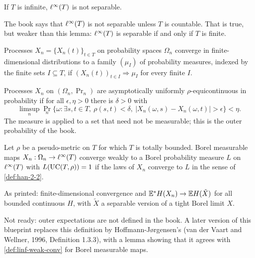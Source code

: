 \begin{lemma}
  \label{lem:linf-nonseparable}
  If $T$ is infinite, $\ell^\infty(T)$ is not separable.
\end{lemma}
\begin{remark}
  The book says that $\ell^\infty(T)$ is not separable unless $T$ is countable. That is true, but weaker than this lemma: $\ell^\infty(T)$ is separable if and only if $T$ is finite.
\end{remark}

\begin{definition}
  \label{def:fidi}
  Processes $X_n=\{X_n(t)\}_{t\in T}$ on probability spaces $\Omega_n$ converge in finite-dimensional distributions to a family $(\mu_I)$ of probability measures, indexed by the finite sets $I\subseteq T$, if $(X_n(t))_{t\in I}\Rightarrow\mu_I$ for every finite $I$.
\end{definition}

\begin{definition}
  \label{def:aec}
  Processes $X_n$ on $(\Omega_n,\Pr_n)$ are asymptotically uniformly $\rho$-equicontinuous in probability if for all $\epsilon,\eta>0$ there is $\delta>0$ with
  \[
    \limsup_n\Pr_n\bigl\{\omega:\exists s,t\in T,\ \rho(s,t)<\delta,\ |X_n(\omega,s)-X_n(\omega,t)|>\epsilon\bigr\}<\eta.
  \]
  The measure is applied to a set that need not be measurable; this is the outer probability of the book.
\end{definition}

\begin{definition}
  \label{def:linf-weak-conv}
  Let $\rho$ be a pseudo-metric on $T$ for which $T$ is totally bounded. Borel measurable maps $X_n:\Omega_n\to\ell^\infty(T)$ converge weakly to a Borel probability measure $L$ on $\ell^\infty(T)$ with $L(\mathrm{UC}(T,\rho))=1$ if the laws of $X_n$ converge to $L$ in the sense of \cref{def:han-2-2}.
\end{definition}

\begin{definition}
  \label{def:han-2-8}
  \notready
  As printed: finite-dimensional convergence and $\mathbb{E}^*H(X_n)\to\mathbb{E} H(\tilde X)$ for all bounded continuous $H$, with $\tilde X$ a separable version of a tight Borel limit $X$.
\end{definition}
\begin{remark}
  Not ready: outer expectations are not defined in the book. A later version of this blueprint replaces this definition by Hoffmann-J{\o}rgensen's (van der Vaart and Wellner, 1996, Definition 1.3.3), with a lemma showing that it agrees with \cref{def:linf-weak-conv} for Borel measurable maps.
\end{remark}

